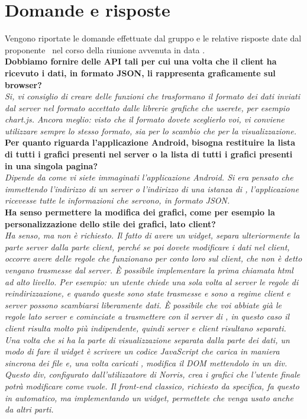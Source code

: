 \section{Domande e risposte}
	Vengono riportate le domande effettuate dal gruppo \groupname{} e le relative risposte date dal proponente \proponente\, nel corso della riunione avvenuta in data .\\

	\textbf{Dobbiamo fornire delle API tali per cui una volta che il client ha ricevuto i dati, in formato JSON, li rappresenta graficamente sul browser?}\\
	\textit{Si, vi consiglio di creare delle funzioni che trasformano il formato dei dati inviati dal server nel formato accettato dalle librerie grafiche che userete, per esempio chart.js. Ancora meglio: visto che il formato dovete sceglierlo voi, vi conviene utilizzare sempre lo stesso formato, sia per lo scambio che per la visualizzazione.}\\

	\textbf{Per quanto riguarda l'applicazione Android, bisogna restituire la lista di tutti i grafici presenti nel server o la lista di tutti i grafici presenti in una singola pagina?}\\
	\textit{Dipende da come vi siete immaginati l'applicazione Android. Si era pensato che immettendo l'indirizzo di un server o l'indirizzo di una istanza di \projectname{}, l'applicazione ricevesse tutte le informazioni che servono, in formato JSON.}\\

	\textbf{Ha senso permettere la modifica dei grafici, come per esempio la personalizzazione dello stile dei grafici, lato client?}\\
	\textit{Ha senso, ma non è richiesto. Il fatto di avere un widget, separa ulteriormente la parte server dalla parte client, perché se poi dovete modificare i dati nel client, occorre avere delle regole che funzionano per conto loro sul client, che non è detto vengano trasmesse dal server. \`{E} possibile implementare la prima chiamata html ad alto livello. Per esempio: un utente chiede una sola volta al server le regole di reindirizzazione, e quando queste sono state trasmesse e sono a regime client e server possono scambiarsi liberamente dati. \`{E} possibile che voi abbiate già le regole lato server e cominciate a trasmettere con il server di \projectname{}, in questo caso il client risulta molto più indipendente, quindi server e client risultano separati. Una volta che si ha la parte di visualizzazione separata dalla parte dei dati, un modo di fare il widget è scrivere un codice JavaScript che carica in maniera sincrona dei file e, una volta caricati , modifica il DOM mettendolo in un div. Questo div, configurato dall'utilizzatore di Norris, crea i grafici che l'utente finale potrà modificare come vuole. Il front-end classico, richiesto da specifica, fa questo in automatico, ma implementando un widget, permettete che venga usato anche da altri parti.}\\